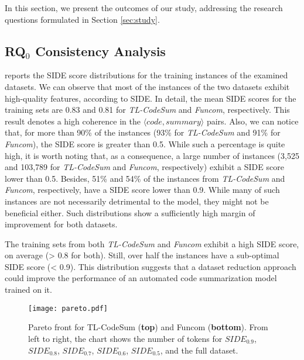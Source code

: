 In this section, we present the outcomes of our study, addressing the research questions formulated in Section \ref{sec:study}.

\subsection{RQ$_{0}$ Consistency Analysis}
\label{rq0}
 reports the SIDE score distributions for the training instances of the examined datasets. We can observe that most of the instances of the two datasets exhibit high-quality features, according to SIDE. In detail, the mean SIDE scores for the training sets are 0.83 and 0.81 for \textit{TL-CodeSum} and \textit{Funcom}, respectively. This result denotes a high coherence in the $\langle code, summary \rangle$ pairs. Also, we can notice that, for more than 90\% of the instances (93\% for \textit{TL-CodeSum} and 91\% for \textit{Funcom}), the SIDE score is greater than 0.5. While such a percentage is quite high, it is worth noting that, as a consequence, a large number of instances (3,525 and 103,789 for \textit{TL-CodeSum} and \textit{Funcom}, respectively) exhibit a SIDE score lower than 0.5. Besides, 51\% and 54\% of the instances from \textit{TL-CodeSum} and \textit{Funcom}, respectively, have a SIDE score lower than 0.9. While many of such instances are not necessarily detrimental to the model, they might not be beneficial either. Such distributions show a sufficiently high margin of improvement for both datasets.

\begin{tcolorbox}[
	colframe=black!100!white, colback=black!10!white,
	coltitle=white, colbacktitle=black!,
	title=Answer to RQ$_{0}$,
	fonttitle=\bfseries,
	rounded corners,
	boxrule=0.5mm,
	width=\linewidth,
	breakable
	]
	
	The training sets from both \textit{TL-CodeSum} and \textit{Funcom} exhibit a high SIDE score, on average (> 0.8 for both). Still, over half the instances have a sub-optimal SIDE score (< 0.9). This distribution suggests that a dataset reduction approach could  improve the performance of an automated code summarization model trained on it.
\end{tcolorbox}


\begin{figure*}[t]
	\centering
	\texttt{[image: pareto.pdf]}
	\caption{Pareto front for TL-CodeSum \cite{hu2018summarizing} (\textbf{top}) and Funcom \cite{leclair2019recommendations} (\textbf{bottom}). From left to right, the chart shows the number of tokens for $SIDE_{0.9}$, $SIDE_{0.8}$, $SIDE_{0.7}$, $SIDE_{0.6}$, $SIDE_{0.5}$, and the full dataset.}
	\label{fig:pareto}
\end{figure*}

